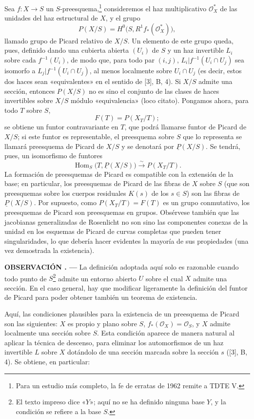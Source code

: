 \documentclass[11pt,twoside,openany]{book}
\numberwithin{equation}{section}
\theoremstyle{plain}
\theoremstyle{definition}
\theoremstyle{remark}
\newcommand{\result}[2]{%
  \par\medskip\noindent\textbf{#1%
  \if\relax\detokenize{#2}\relax\else\space#2\fi. ---}\enspace
}
\theoremstyle{plain}
\theoremstyle{definition}
\theoremstyle{remark}
\begin{document}
Sea $f:X\longrightarrow S$ un $S$-preesquema,\footnote{Para un estudio más
completo, la fe de erratas de 1962 remite a TDTE V.} consideremos el haz
multiplicativo $\mathcal O_X^*$ de las unidades del haz estructural de $X$, y
el grupo
\[
  P(X/S)=H^0\bigl(S,R^1f_*(\mathcal O_X^*)\bigr),
\]
llamado grupo de Picard relativo de $X/S$. Un elemento de este grupo queda,
pues, definido dando una cubierta abierta $(U_i)$ de $S$ y un haz invertible
$L_i$ sobre cada $f^{-1}(U_i)$, de modo que, para todo par $(i,j)$,
$L_i|f^{-1}(U_i\cap U_j)$ sea isomorfo a $L_j|f^{-1}(U_i\cap U_j)$, al menos
localmente sobre $U_i\cap U_j$ (es decir, estos dos haces sean «equivalentes»
en el sentido de [3], B, 4). Si $X/S$ admite una sección, entonces $P(X/S)$ no
es sino el conjunto de las clases de haces invertibles sobre $X/S$ módulo
«equivalencia» (loco citato). Pongamos ahora, para todo $T$ sobre $S$,
\[
  F(T)=P(X_T/T) ;
\]
se obtiene un funtor contravariante en $T$, que podrá llamarse funtor de Picard de
$X/S$; si este funtor es representable, el preesquema sobre $S$ que lo
representa se llamará preesquema de Picard de $X/S$ y se denotará por
$\underline P(X/S)$. Se tendrá, pues, un isomorfismo de funtores
\[
  \operatorname{Hom}_S\bigl(T,\underline P(X/S)\bigr)
  \xrightarrow{\sim}P(X_T/T).
\]
La formación de preesquemas de Picard es compatible con la extensión de la
base; en particular, los preesquemas de Picard de las fibras de $X$ sobre $S$
(que son preesquemas sobre los cuerpos residuales $K(s)$ de los $s\in S$) son
las fibras de $\underline P(X/S)$. Por supuesto, como $P(X_T/T)=F(T)$ es un
grupo conmutativo, los preesquemas de Picard son preesquemas en grupos.
Obsérvese también que las jacobianas generalizadas de Rosenlicht no son sino
las componentes conexas de la unidad en los esquemas de Picard de curvas
completas que pueden tener singularidades, lo que debería hacer evidentes la
mayoría de sus propiedades (una vez demostrada la existencia).

\result{OBSERVACIÓN}{} La definición adoptada aquí solo es razonable cuando
todo punto de $S$\footnote{El texto impreso dice «$Y$»; aquí no se ha definido
ninguna base $Y$, y la condición se refiere a la base $S$.} admite un entorno
abierto $U$ sobre el cual $X$ admite una sección. En el caso general, hay que
modificar ligeramente la definición del funtor de Picard para poder obtener
también un teorema de existencia.

Aquí, las condiciones plausibles para la existencia de un preesquema de Picard
son las siguientes: $X$ es propio y plano sobre $S$,
$f_*(\mathcal O_X)=\mathcal O_S$, y $X$ admite localmente una sección sobre
$S$. Esta condición aparece de manera natural al aplicar la técnica de
descenso, para eliminar los automorfismos de un haz invertible $L$ sobre $X$
dotándolo de una sección marcada sobre la sección $s$ ([3], B, 4). Se obtiene,
en particular:
\end{document}
